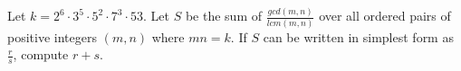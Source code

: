 Let $k = 2^6 \cdot  3^5 \cdot  5^2 \cdot 7^3 \cdot 53$.
Let $S$ be the sum of $\frac{gcd(m,n)}{lcm(m,n)}$ over all ordered pairs of positive integers $(m, n)$ where $mn = k$.
If $S$ can be written in simplest form as $\frac{r}{s}$, compute $r + s$.